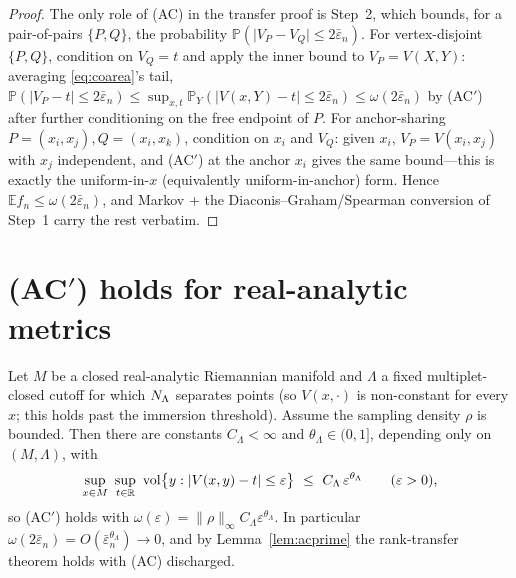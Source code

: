 \begin{proof}
The only role of (AC) in the transfer proof is Step~2, which bounds, for a pair-of-pairs
$\{P,Q\}$, the probability $\mathbb P(\lvert V_P-V_Q\rvert\le2\bar\varepsilon_n)$. For
vertex-disjoint $\{P,Q\}$, condition on $V_Q=t$ and apply the inner bound to
$V_P=V(X,Y)$: averaging \eqref{eq:coarea}'s tail,
$\mathbb P(\lvert V_P-t\rvert\le2\bar\varepsilon_n)\le\sup_{x,t}\mathbb P_Y(\lvert V(x,Y)-t\rvert\le2\bar\varepsilon_n)\le\omega(2\bar\varepsilon_n)$
by (AC$'$) after further conditioning on the free endpoint of $P$. For anchor-sharing
$P=(x_i,x_j),Q=(x_i,x_k)$, condition on $x_i$ and $V_Q$: given $x_i$, $V_P=V(x_i,x_j)$
with $x_j$ independent, and (AC$'$) at the anchor $x_i$ gives the same bound---this is
exactly the uniform-in-$x$ (equivalently uniform-in-anchor) form. Hence
$\mathbb E f_n\le\omega(2\bar\varepsilon_n)$, and Markov + the Diaconis--Graham/Spearman
conversion of Step~1 carry the rest verbatim.
\end{proof}

\section{(AC$'$) holds for real-analytic metrics}

\begin{theorem}\label{thm:loja}
Let $M$ be a closed real-analytic Riemannian manifold and $\Lambda$ a fixed
multiplet-closed cutoff for which $N_\Lambda$ separates points (so $V(x,\cdot)$ is non-constant
for every $x$; this holds past the immersion threshold). Assume the sampling density
$\rho$ is bounded. Then there are constants $C_\Lambda<\infty$ and
$\theta_\Lambda\in(0,1]$, depending only on $(M,\Lambda)$, with
\[
\sup_{x\in M}\ \sup_{t\in\mathbb R}\ \vol\bigl\{y:\lvert V(x,y)-t\rvert\le\varepsilon\bigr\}\ \le\ C_\Lambda\,\varepsilon^{\theta_\Lambda}
\qquad(\varepsilon>0),
\]
so (AC$'$) holds with $\omega(\varepsilon)=\lVert\rho\rVert_\infty C_\Lambda\varepsilon^{\theta_\Lambda}$.
In particular $\omega(2\bar\varepsilon_n)=O(\bar\varepsilon_n^{\theta_\Lambda})\to0$, and
by Lemma~\ref{lem:acprime} the rank-transfer theorem holds with (AC) discharged.
\end{theorem}

